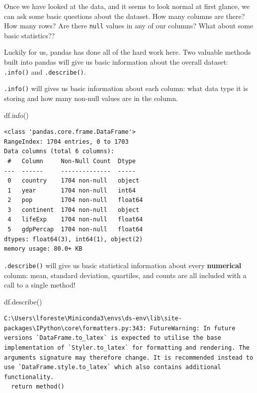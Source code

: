 \documentclass[
  letterpaper,
  DIV=11,
  numbers=noendperiod]{scrreprt}
\newenvironment{Shaded}{\begin{snugshade}}{\end{snugshade}}
\newcommand{\NormalTok}[1]{\textcolor[rgb]{0.00,0.23,0.31}{#1}}
\begin{document}
Once we have looked at the data, and it seems to look normal at first
glance, we can ask some basic questions about the dataset. How many
columns are there? How many rows? Are there \texttt{null} values in any
of our columns? What about some basic statistics??

Luckily for us, pandas has done all of the hard work here. Two valuable
methods built into pandas will give us basic information about the
overall dataset: \texttt{.info()} and \texttt{.describe()}.

\texttt{.info()} will gives us basic information about each column: what
data type it is storing and how many non-null values are in the column.

\begin{Shaded}
\begin{Highlighting}[]
\NormalTok{df.info()}
\end{Highlighting}
\end{Shaded}

\begin{verbatim}
<class 'pandas.core.frame.DataFrame'>
RangeIndex: 1704 entries, 0 to 1703
Data columns (total 6 columns):
 #   Column     Non-Null Count  Dtype  
---  ------     --------------  -----  
 0   country    1704 non-null   object 
 1   year       1704 non-null   int64  
 2   pop        1704 non-null   float64
 3   continent  1704 non-null   object 
 4   lifeExp    1704 non-null   float64
 5   gdpPercap  1704 non-null   float64
dtypes: float64(3), int64(1), object(2)
memory usage: 80.0+ KB
\end{verbatim}

\texttt{.describe()} will give us basic statistical information about
every \textbf{numerical} column: mean, standard deviation, quartiles,
and counts are all included with a call to a single method!

\begin{Shaded}
\begin{Highlighting}[]
\NormalTok{df.describe()}
\end{Highlighting}
\end{Shaded}

\begin{verbatim}
C:\Users\lforeste\Miniconda3\envs\ds-env\lib\site-packages\IPython\core\formatters.py:343: FutureWarning: In future versions `DataFrame.to_latex` is expected to utilise the base implementation of `Styler.to_latex` for formatting and rendering. The arguments signature may therefore change. It is recommended instead to use `DataFrame.style.to_latex` which also contains additional functionality.
  return method()
\end{verbatim}
\end{document}
